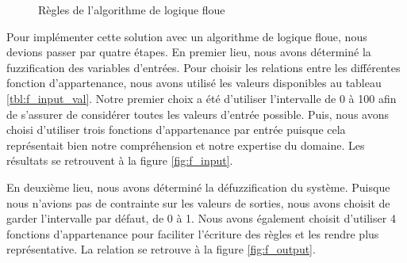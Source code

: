\documentclass[12pt,letterpaper]{article}
\begin{document}
\begin{figure}
    \quad

    \caption{Règles de l'algorithme de logique floue}
    \label{fig:f_rule}
\end{figure}


Pour implémenter cette solution avec un algorithme de logique floue, nous devions passer par quatre étapes. En premier lieu, nous avons déterminé la fuzzification des variables d'entrées. Pour choisir les relations entre les différentes fonction d'appartenance, nous avons utilisé les valeurs disponibles au tableau \ref{tbl:f_input_val}. Notre premier choix a été d'utiliser l'intervalle de 0 à 100 afin de s'assurer de considérer toutes les valeurs d'entrée possible. Puis, nous avons choisi d'utiliser trois fonctions d'appartenance par entrée puisque cela représentait bien notre compréhension et notre expertise du domaine. Les résultats se retrouvent à la figure \ref{fig:f_input}.

En deuxième lieu, nous avons déterminé la défuzzification du système. Puisque nous n'avions pas de contrainte sur les valeurs de sorties, nous avons choisit de garder l'intervalle par défaut, de 0 à 1. Nous avons également choisit d'utiliser 4 fonctions d'appartenance pour faciliter l'écriture des règles et les rendre plus représentative. La relation se retrouve à la figure \ref{fig:f_output}.
\end{document}
